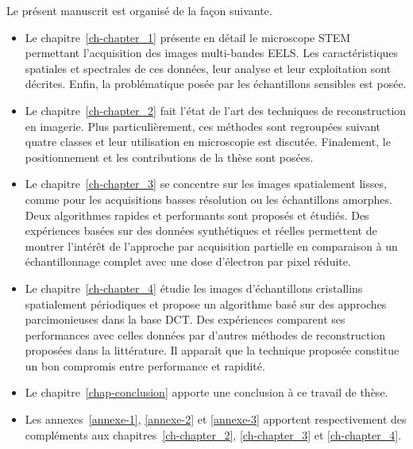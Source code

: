 Le présent manuscrit est organisé de la façon suivante.
\begin{itemize}
    \item Le chapitre~\ref{ch-chapter_1} présente en détail le microscope STEM permettant l'acquisition des images multi-bandes EELS. Les caractéristiques spatiales et spectrales de ces données, leur analyse et leur exploitation sont décrites. Enfin, la problématique posée par les échantillons sensibles  est posée.
    \item Le chapitre~\ref{ch-chapter_2} fait l'état de l'art des techniques de reconstruction en imagerie. Plus particulièrement, ces méthodes sont regroupées suivant quatre classes et leur utilisation en microscopie est discutée. Finalement, le positionnement et les contributions de la thèse sont posées.
    \item Le chapitre~\ref{ch-chapter_3} se concentre sur les images spatialement lisses, comme pour les acquisitions basses résolution ou les échantillons amorphes. Deux algorithmes rapides et performants sont proposés et étudiés. Des expériences basées sur des données synthétiques et réelles permettent de montrer l'intérêt de l'approche par acquisition partielle en comparaison à un échantillonnage complet avec une dose d'électron par pixel réduite.
    \item Le chapitre~\ref{ch-chapter_4} étudie les images d'échantillons cristallins spatialement périodiques et propose un algorithme basé sur des approches parcimonieuses dans la base DCT. Des expériences comparent ses performances avec celles données par d'autres méthodes de reconstruction proposées dans la littérature. Il apparaît que la technique proposée constitue un bon compromis entre performance et rapidité.
    \item Le chapitre~\ref{chap-conclusion} apporte une conclusion à ce travail de thèse.
    \item Les annexes~\ref{annexe-1}, \ref{annexe-2} et \ref{annexe-3} apportent respectivement des compléments aux chapitres~\ref{ch-chapter_2}, \ref{ch-chapter_3} et \ref{ch-chapter_4}.
\end{itemize} 
 
 
 
 





